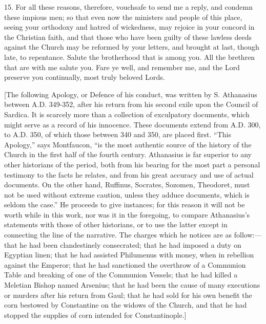 15. For all these reasons, therefore, vouchsafe
to send me a reply, and condemn these impious men; so that even
now the ministers and people of this place, seeing your orthodoxy and
hatred of wickedness, may rejoice in your concord in the Christian
faith, and that those who have been guilty of these lawless deeds
against the Church may be reformed by your letters, and brought at
last, though late, to repentance. Salute the brotherhood that is among
you. All the brethren that are with me salute you. Fare ye well, and
remember me, and the Lord preserve you continually, most truly beloved
Lords.


[The following Apology, or Defence of his
conduct, was written by S. Athanasius between A.D. 349-352, after his
return from his second exile upon the Council of Sardica. It is
scarcely more than a collection of exculpatory documents, which might
serve as a record of his innocence. These documents extend from A.D.
300, to A.D. 350, of which those between 340 and 350, are placed
first. ``This Apology,'' says Montfaucon, ``is the most authentic source
of the history of the Church in the first half of the fourth century.
Athanasius is far superior to any other historians of the period, both
from his bearing for the most part a personal testimony to the facts
he relates, and from his great accuracy and use of actual documents.
On the other hand, Ruffinus, Socrates, Sozomen, Theodoret, must not be
used without extreme caution, unless they adduce documents, which is
seldom the case.'' He proceeds to give instances; for this reason it
will not be worth while in this work, nor was it in the foregoing, to
compare Athanasius's statements with those of other historians, or to
use the latter except in connecting the line of the narrative. The
charges which he notices are as follow:—that he had been
clandestinely consecrated; that he had imposed a duty on Egyptian
linen; that he had assisted Philumenus with money, when in rebellion
against the Emperor; that he had sanctioned the overthrow of a
Communion Table and breaking of one of the Communion Vessels; that he
had killed a Meletian Bishop named Arsenius; that he had been the
cause of many executions or murders after his return from Gaul; that
he had sold for his own benefit the corn bestowed by Constantine on
the widows of the Church, and that he had stopped the supplies of corn
intended for Constantinople.]

